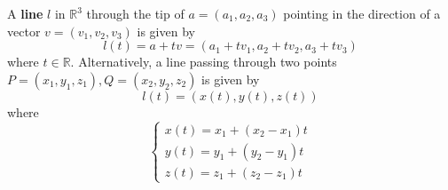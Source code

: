 \documentclass[openany]{book}
\newcommand{\R}{\mathbb{R}}
\begin{document}
\begin{defn}\label{line}
    A \textbf{line} $l$ in $\R^3$ through the tip of $a=(a_1,a_2,a_3)$ pointing in the direction of a vector $v=(v_1,v_2,v_3)$ is given by 
    \begin{equation*}
        l(t)=a+tv=(a_1+tv_1, a_2+tv_2, a_3+tv_3)
    \end{equation*}
    where $t\in\R$. Alternatively, a line passing through two points $P=(x_1,y_1,z_1), Q=(x_2,y_2,z_2)$ is given by 
    \begin{equation*}
        l(t)=(x(t), y(t), z(t))
    \end{equation*}
    where 
    \begin{equation*}
        \begin{cases}
            x(t)=x_1+(x_2-x_1)t\\
            y(t)=y_1+(y_2-y_1)t\\
            z(t)=z_1+(z_2-z_1)t
        \end{cases}
    \end{equation*}
\end{defn}
\end{document}

